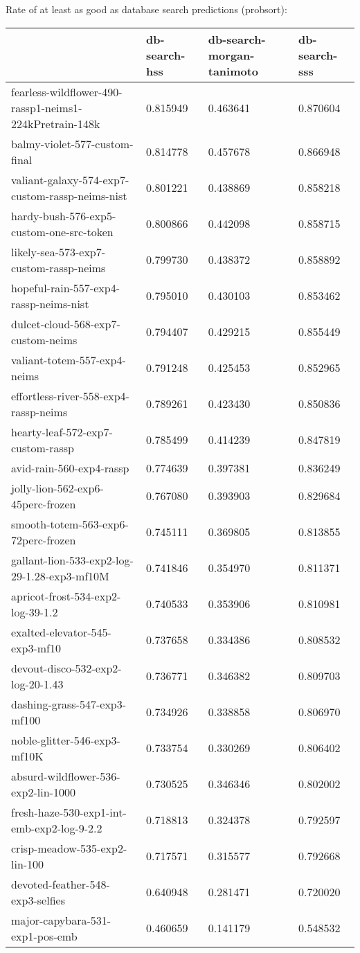 Rate of at least as good as database search predictions (probsort):
\begin{tabular}{llll}
\toprule
 & db-search-hss & db-search-morgan-tanimoto & db-search-sss \\
\midrule
fearless-wildflower-490-rassp1-neims1-224kPretrain-148k & 0.815949 & 0.463641 & 0.870604 \\
balmy-violet-577-custom-final & 0.814778 & 0.457678 & 0.866948 \\
valiant-galaxy-574-exp7-custom-rassp-neims-nist & 0.801221 & 0.438869 & 0.858218 \\
hardy-bush-576-exp5-custom-one-src-token & 0.800866 & 0.442098 & 0.858715 \\
likely-sea-573-exp7-custom-rassp-neims & 0.799730 & 0.438372 & 0.858892 \\
hopeful-rain-557-exp4-rassp-neims-nist & 0.795010 & 0.430103 & 0.853462 \\
dulcet-cloud-568-exp7-custom-neims & 0.794407 & 0.429215 & 0.855449 \\
valiant-totem-557-exp4-neims & 0.791248 & 0.425453 & 0.852965 \\
effortless-river-558-exp4-rassp-neims & 0.789261 & 0.423430 & 0.850836 \\
hearty-leaf-572-exp7-custom-rassp & 0.785499 & 0.414239 & 0.847819 \\
avid-rain-560-exp4-rassp & 0.774639 & 0.397381 & 0.836249 \\
jolly-lion-562-exp6-45perc-frozen & 0.767080 & 0.393903 & 0.829684 \\
smooth-totem-563-exp6-72perc-frozen & 0.745111 & 0.369805 & 0.813855 \\
gallant-lion-533-exp2-log-29-1.28-exp3-mf10M & 0.741846 & 0.354970 & 0.811371 \\
apricot-frost-534-exp2-log-39-1.2 & 0.740533 & 0.353906 & 0.810981 \\
exalted-elevator-545-exp3-mf10 & 0.737658 & 0.334386 & 0.808532 \\
devout-disco-532-exp2-log-20-1.43 & 0.736771 & 0.346382 & 0.809703 \\
dashing-grass-547-exp3-mf100 & 0.734926 & 0.338858 & 0.806970 \\
noble-glitter-546-exp3-mf10K & 0.733754 & 0.330269 & 0.806402 \\
absurd-wildflower-536-exp2-lin-1000 & 0.730525 & 0.346346 & 0.802002 \\
fresh-haze-530-exp1-int-emb-exp2-log-9-2.2 & 0.718813 & 0.324378 & 0.792597 \\
crisp-meadow-535-exp2-lin-100 & 0.717571 & 0.315577 & 0.792668 \\
devoted-feather-548-exp3-selfies & 0.640948 & 0.281471 & 0.720020 \\
major-capybara-531-exp1-pos-emb & 0.460659 & 0.141179 & 0.548532 \\
\bottomrule
\end{tabular}



